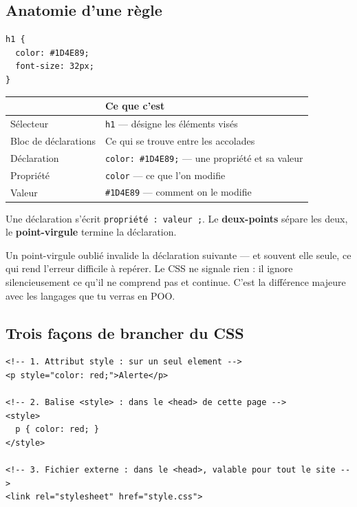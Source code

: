 \documentclass[a4paper,11pt]{article}
\newcommand{\hdr}[1]{\multicolumn{1}{l}{\color{white}\bfseries #1}}
\renewcommand{\arraystretch}{1.3}
\begin{document}
\subsection{Anatomie d'une règle}

\begin{lstlisting}[language=CSS3, caption={Une règle CSS et son vocabulaire}]
h1 {
  color: #1D4E89;
  font-size: 32px;
}
\end{lstlisting}

\begin{center}
\renewcommand{\arraystretch}{1.0}
\begin{tabularx}{\linewidth}{p{3.2cm}X}
  \toprule
  \rowcolor{uniNavy}
  \hdr{Terme} & \hdr{Ce que c'est} \\
  \midrule
  \rowcolor{uniPaper}
  Sélecteur & \texttt{h1} --- désigne les éléments visés \\
  Bloc de déclarations & Ce qui se trouve entre les accolades \\
  \rowcolor{uniPaper}
  Déclaration & \texttt{color: \#1D4E89;} --- une propriété et sa valeur \\
  Propriété & \texttt{color} --- ce que l'on modifie \\
  \rowcolor{uniPaper}
  Valeur & \texttt{\#1D4E89} --- comment on le modifie \\
  \bottomrule
\end{tabularx}
\end{center}

\begin{tcolorbox}[attention, title={Le point-virgule et les deux-points}]
Une déclaration s'écrit \texttt{propriété\,:\,valeur\,;}. Le \textbf{deux-points} sépare les deux, le \textbf{point-virgule} termine la déclaration.

\vspace{3pt}
Un point-virgule oublié invalide la déclaration suivante --- et souvent elle seule, ce qui rend l'erreur difficile à repérer. Le CSS ne signale rien : il ignore silencieusement ce qu'il ne comprend pas et continue. C'est la différence majeure avec les langages que tu verras en POO.
\end{tcolorbox}

\subsection{Trois façons de brancher du CSS}

\begin{lstlisting}[language=HTML5, caption={Les trois emplacements possibles}]
<!-- 1. Attribut style : sur un seul element -->
<p style="color: red;">Alerte</p>

<!-- 2. Balise <style> : dans le <head> de cette page -->
<style>
  p { color: red; }
</style>

<!-- 3. Fichier externe : dans le <head>, valable pour tout le site -->
<link rel="stylesheet" href="style.css">
\end{lstlisting}
\end{document}
